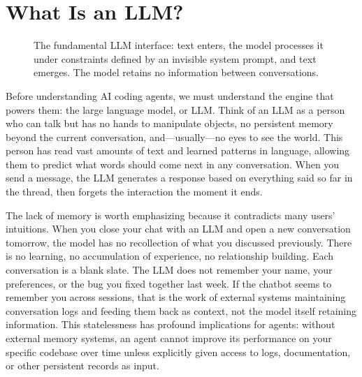 
\section{What Is an LLM?}\label{sec:llm}

\begin{figure}[t]
\centering
{}
\caption{The fundamental LLM interface: text enters, the model processes it under constraints defined by an invisible system prompt, and text emerges. The model retains no information between conversations.}
\label{fig:llm_io}
\end{figure}

Before understanding AI coding agents, we must understand the engine that powers them: the large language model, or LLM. Think of an LLM as a person who can talk but has no hands to manipulate objects, no persistent memory beyond the current conversation, and---usually---no eyes to see the world. This person has read vast amounts of text and learned patterns in language, allowing them to predict what words should come next in any conversation. When you send a message, the LLM generates a response based on everything said so far in the thread, then forgets the interaction the moment it ends.

The lack of memory is worth emphasizing because it contradicts many users' intuitions. When you close your chat with an LLM and open a new conversation tomorrow, the model has no recollection of what you discussed previously. There is no learning, no accumulation of experience, no relationship building. Each conversation is a blank slate. The LLM does not remember your name, your preferences, or the bug you fixed together last week. If the chatbot seems to remember you across sessions, that is the work of external systems maintaining conversation logs and feeding them back as context, not the model itself retaining information. This statelessness has profound implications for agents: without external memory systems, an agent cannot improve its performance on your specific codebase over time unless explicitly given access to logs, documentation, or other persistent records as input.

